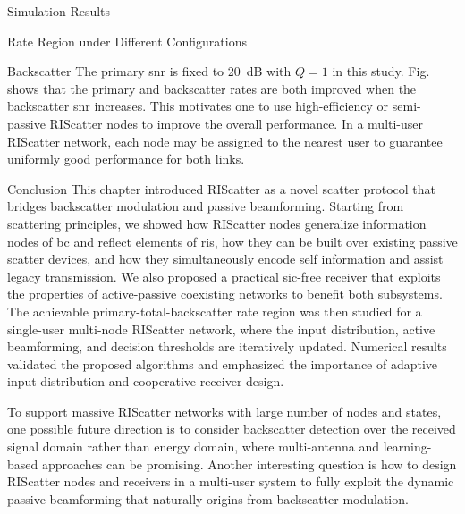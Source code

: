 \begin{section}{Simulation Results}
\begin{subsection}{Rate Region under Different Configurations}
		\begin{subsubsection}{Backscatter }
			The primary \gls{snr} is fixed to \qty{20}{dB} with $Q=1$ in this study.
			Fig.~ shows that the primary and backscatter rates are both improved when the backscatter \gls{snr} increases.
			This motivates one to use high-efficiency or semi-passive RIScatter nodes to improve the overall performance.
			In a multi-user RIScatter network, each node may be assigned to the nearest user to guarantee uniformly good performance for both links.
		\end{subsubsection}
	\end{subsection}
\end{section}

\begin{section}{Conclusion}
	\label{sc:conclusion}
	This chapter introduced RIScatter as a novel scatter protocol that bridges backscatter modulation and passive beamforming.
	Starting from scattering principles, we showed how RIScatter nodes generalize information nodes of \gls{bc} and reflect elements of \gls{ris}, how they can be built over existing passive scatter devices, and how they simultaneously encode self information and assist legacy transmission.
	We also proposed a practical \gls{sic}-free receiver that exploits the properties of active-passive coexisting networks to benefit both subsystems.
	The achievable primary-total-backscatter rate region was then studied for a single-user multi-node RIScatter network, where the input distribution, active beamforming, and decision thresholds are iteratively updated.
	Numerical results validated the proposed algorithms and emphasized the importance of adaptive input distribution and cooperative receiver design.

	To support massive RIScatter networks with large number of nodes and states, one possible future direction is to consider backscatter detection over the received signal domain rather than energy domain, where multi-antenna \cite{Liu2024} and learning-based approaches can be promising.
	Another interesting question is how to design RIScatter nodes and receivers in a multi-user system to fully exploit the dynamic passive beamforming that naturally origins from backscatter modulation.
\end{section}

